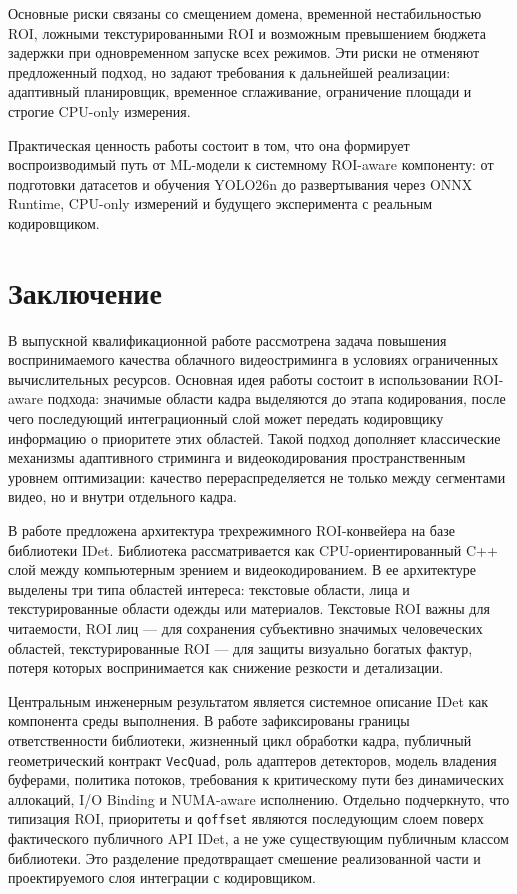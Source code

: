 \documentclass[12pt,a4paper,oneside,openany]{report}
\begin{document}
Основные риски связаны со смещением домена, временной нестабильностью ROI, ложными текстурированными ROI и возможным превышением бюджета задержки при одновременном запуске всех режимов. Эти риски не отменяют предложенный подход, но задают требования к дальнейшей реализации: адаптивный планировщик, временное сглаживание, ограничение площади и строгие CPU-only измерения.

Практическая ценность работы состоит в том, что она формирует воспроизводимый путь от ML-модели к системному ROI-aware компоненту: от подготовки датасетов и обучения YOLO26n до развертывания через ONNX Runtime, CPU-only измерений и будущего эксперимента с реальным кодировщиком.


\chapter*{Заключение}

В выпускной квалификационной работе рассмотрена задача повышения воспринимаемого качества облачного видеостриминга в условиях ограниченных вычислительных ресурсов. Основная идея работы состоит в использовании ROI-aware подхода: значимые области кадра выделяются до этапа кодирования, после чего последующий интеграционный слой может передать кодировщику информацию о приоритете этих областей. Такой подход дополняет классические механизмы адаптивного стриминга и видеокодирования пространственным уровнем оптимизации: качество перераспределяется не только между сегментами видео, но и внутри отдельного кадра.

В работе предложена архитектура трехрежимного ROI-конвейера на базе библиотеки IDet. Библиотека рассматривается как CPU-ориентированный C++ слой между компьютерным зрением и видеокодированием. В ее архитектуре выделены три типа областей интереса: текстовые области, лица и текстурированные области одежды или материалов. Текстовые ROI важны для читаемости, ROI лиц --- для сохранения субъективно значимых человеческих областей, текстурированные ROI --- для защиты визуально богатых фактур, потеря которых воспринимается как снижение резкости и детализации.

Центральным инженерным результатом является системное описание IDet как компонента среды выполнения. В работе зафиксированы границы ответственности библиотеки, жизненный цикл обработки кадра, публичный геометрический контракт \texttt{VecQuad}, роль адаптеров детекторов, модель владения буферами, политика потоков, требования к критическому пути без динамических аллокаций, I/O Binding и NUMA-aware исполнению. Отдельно подчеркнуто, что типизация ROI, приоритеты и \texttt{qoffset} являются последующим слоем поверх фактического публичного API IDet, а не уже существующим публичным классом библиотеки. Это разделение предотвращает смешение реализованной части и проектируемого слоя интеграции с кодировщиком.
\end{document}
